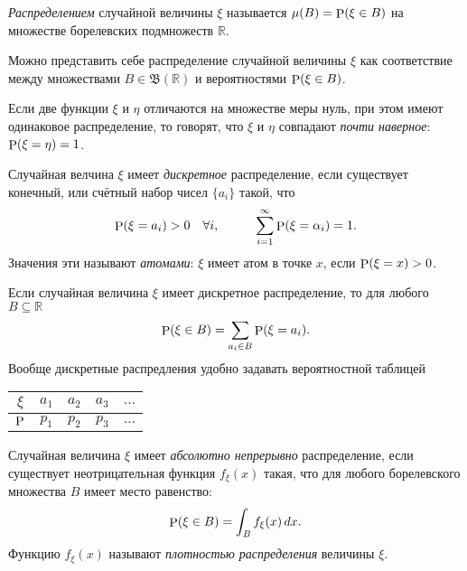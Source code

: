 \begin{to_def}
    \textit{Распределением} случайной величины $\xi$ называется  $\mu(B) = \P(\xi \in B)$ на множестве борелевских подмножеств $\mathbb{R}$.
\end{to_def}

Можно представить себе распределение случайной величины $\xi$ как соответствие между множествами $B \in \mathfrak B (\mathbb{R})$ и вероятностями $\P(\xi \in B)$.

\begin{to_def}
    Если две функции $\xi$ и $\eta$  отличаются на множестве меры нуль, при этом имеют одинаковое распределение, то говорят, что $\xi$ и $\eta$ совпадают \textit{почти наверное}: $\P (\xi = \eta) =1$.
\end{to_def}

\begin{to_def}
    Случайная велчина $\xi$ имеет \textit{дискретное} распределение, если существует конечный, или счётный набор чисел $\{a_i\}$ такой, что
    \begin{equation*}
        \P(\xi = a_i) > 0 \ \ \ \forall i, \hspace{10 mm}
        \sum_{i=1}^{\infty} \P (\xi = \alpha_i) = 1.
    \end{equation*}
    Значения эти называют \textit{атомами}: $\xi$ имеет атом в точке $x$, если $\P(\xi = x) > 0$.
\end{to_def}

Если случайная величина $\xi$ имеет дискретное распределение, то для любого $B \subseteq \mathbb{R}$
\begin{equation*}
    \P(\xi \in B) = \sum_{a_i \in B} \P (\xi = a_i).
\end{equation*}
Вообще дискретные распредления удобно задавать вероятностной таблицей
\begin{center}
    \begin{tabular}{c|c|c|c|c}
        $\xi$ & $a_1$ & $a_2$ & $a_3$ & $\ldots$ \\
        \hline
        $\P$ & $p_1$ & $p_2$ & $p_3$ & $\ldots$ \\
    \end{tabular}
\end{center}

\begin{to_def}
    Случайная величина $\xi$ имеет \textit{абсолютно непрерывно} распределение, если существует неотрицательная функция $f_\xi (x)$ такая, что для любого борелевского множества $B$ имеет место равенство:
    \begin{equation*}
        \P (\xi \in B) = \int_B f_\xi (x) \d x.
    \end{equation*}
    Функцию $f_\xi (x)$ называют \textit{плотностью распределения} величины $\xi$.
\end{to_def}

